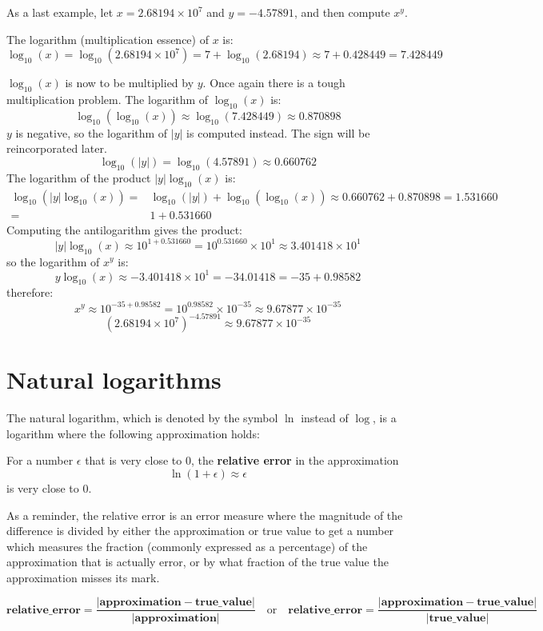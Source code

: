 \documentclass{article}
\begin{document}
As a last example, let \(x = 2.68194 \times 10^7\) and \(y = -4.57891\), and then compute \(x^y\). 

The logarithm (multiplication essence) of \(x\) is: 
\[\log_{10}(x) = \log_{10}(2.68194 \times 10^7) = 7 + \log_{10}(2.68194) \approx 7 + 0.428449 = 7.428449\]

\(\log_{10}(x)\) is now to be multiplied by \(y\). Once again there is a tough multiplication problem. The logarithm of \(\log_{10}(x)\) is:
\[\log_{10}(\log_{10}(x)) \approx \log_{10}(7.428449) \approx 0.870898\]
\(y\) is negative, so the logarithm of \(|y|\) is computed instead. The sign will be reincorporated later. 
\[\log_{10}(|y|) = \log_{10}(4.57891) \approx 0.660762\]
The logarithm of the product \(|y|\log_{10}(x)\) is:
\begin{align*}
\log_{10}(|y|\log_{10}(x)) = & \log_{10}(|y|) + \log_{10}(\log_{10}(x)) \approx 0.660762 + 0.870898 = 1.531660 \\
= & 1 + 0.531660
\end{align*}
Computing the antilogarithm gives the product:
\[|y|\log_{10}(x) \approx 10^{1 + 0.531660} = 10^{0.531660} \times 10^1 \approx 3.401418 \times 10^1\]
so the logarithm of \(x^y\) is:
\[y\log_{10}(x) \approx -3.401418 \times 10^1 = -34.01418 = -35 + 0.98582\]
therefore:
\[x^y \approx 10^{-35 + 0.98582} = 10^{0.98582} \times 10^{-35} \approx 9.67877 \times 10^{-35}\]
\[(2.68194 \times 10^7)^{-4.57891} \approx 9.67877 \times 10^{-35}\]



\section*{Natural logarithms}

The natural logarithm, which is denoted by the symbol \(\ln\) instead of \(\log\), is a logarithm where the following approximation holds:

For a number \(\epsilon\) that is very close to \(0\), the {\bf relative error} in the approximation 
\[\ln(1 + \epsilon) \approx \epsilon\]
is very close to \(0\).

As a reminder, the relative error is an error measure where the magnitude of the difference is divided by either the approximation or true value to get a number which measures the fraction (commonly expressed as a percentage) of the approximation that is actually error, or by what fraction of the true value the approximation misses its mark.

\[\textbf{relative\_error} = \frac{|\textbf{approximation} - \textbf{true\_value}|}{|\textbf{approximation}|} \quad\text{or}\quad \textbf{relative\_error} = \frac{|\textbf{approximation} - \textbf{true\_value}|}{|\textbf{true\_value}|}\]
\end{document}
